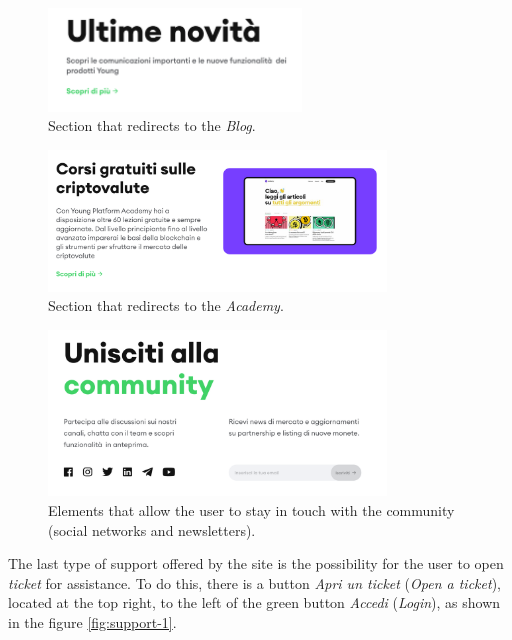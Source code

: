 \begin{figure}[H]
  \centering
  \includegraphics[width=0.60\textwidth]{res/images/internal-pages/support/support-4.png}
  \caption{Section that redirects to the \textit{Blog}.}
  \label{fig:support-4}
\end{figure}

\begin{figure}[H]
  \centering
  \includegraphics[width=0.80\textwidth]{res/images/internal-pages/support/support-5.png}
  \caption{Section that redirects to the \textit{Academy}.}
  \label{fig:support-5}
\end{figure}

\begin{figure}[H]
  \centering
  \includegraphics[width=0.80\textwidth]{res/images/internal-pages/support/support-6.png}
  \caption{Elements that allow the user to stay in touch with the 
  community (social networks and newsletters).}
  \label{fig:support-6}
\end{figure}

The last type of support offered by the site is the possibility for the 
user to open \textit{ticket} for assistance. To do this, there is a 
button \textit{Apri un ticket} (\textit{Open a ticket}), located at the 
top right, to the left of the green button \textit{Accedi} (\textit{Login}), 
as shown in the figure \ref{fig:support-1}. 

